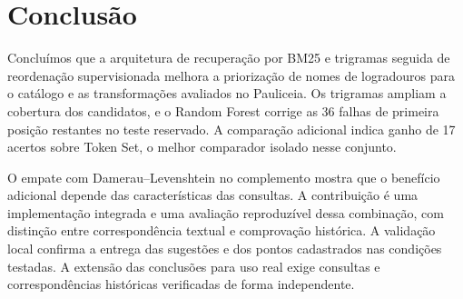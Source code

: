 \section{Conclusão}

Concluímos que a arquitetura de recuperação por BM25 e trigramas seguida de reordenação supervisionada melhora a priorização de nomes de logradouros para o catálogo e as transformações avaliados no Pauliceia. Os trigramas ampliam a cobertura dos candidatos, e o Random Forest corrige as 36 falhas de primeira posição restantes no teste reservado. A comparação adicional indica ganho de 17 acertos sobre Token Set, o melhor comparador isolado nesse conjunto.

O empate com Damerau--Levenshtein no complemento mostra que o benefício adicional depende das características das consultas. A contribuição é uma implementação integrada e uma avaliação reproduzível dessa combinação, com distinção entre correspondência textual e comprovação histórica. A validação local confirma a entrega das sugestões e dos pontos cadastrados nas condições testadas. A extensão das conclusões para uso real exige consultas e correspondências históricas verificadas de forma independente.
